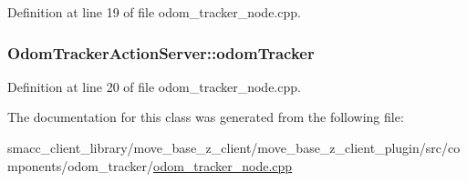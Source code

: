 Definition at line 19 of file odom\+\_\+tracker\+\_\+node.\+cpp.

\subsubsection[{\texorpdfstring{odom\+Tracker}{odomTracker}}]{ Odom\+Tracker\+Action\+Server\+::odom\+Tracker}\hypertarget{classOdomTrackerActionServer_a3e5c4328d3206fbd2fd2708f0aefe651}{}\label{classOdomTrackerActionServer_a3e5c4328d3206fbd2fd2708f0aefe651}


Definition at line 20 of file odom\+\_\+tracker\+\_\+node.\+cpp.



The documentation for this class was generated from the following file\+:\begin{DoxyCompactItemize}
\item 
smacc\+\_\+client\+\_\+library/move\+\_\+base\+\_\+z\+\_\+client/move\+\_\+base\+\_\+z\+\_\+client\+\_\+plugin/src/components/odom\+\_\+tracker/\hyperlink{odom__tracker__node_8cpp}{odom\+\_\+tracker\+\_\+node.\+cpp}\end{DoxyCompactItemize}
